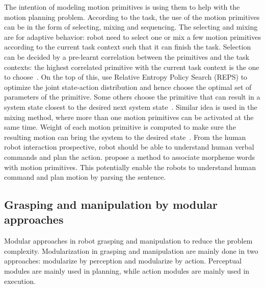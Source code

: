 The intention of modeling motion primitives is using them to help with the motion planning problem. According to the task, the use of the motion primitives can be in the form of selecting, mixing and sequencing. The selecting and mixing are for adaptive behavior: robot need to select one or mix a few motion primitives according to the current task context such that it can finish the task.
Selection can be decided by a pre-learnt correlation between the primitives and the task contexts: the highest correlated primitive with the current task context is the one to choose~\citep{takano2006primitive}. On the top of this, \citet{daniel2013learning} use Relative Entropy Policy Search (REPS) to optimize the joint state-action distribution and hence choose the optimal set of parameters of the primitive.
Some others choose the primitive that can result in a system state closest to the desired next system state~\citep{hauser2008using}. Similar idea is used in the mixing method, where more than one motion primitives can be activated at the same time. Weight of each motion primitive is computed to make sure the resulting motion can bring the system to the desired state~\citep{bidan2013robio,sugimoto2012emosaic}. From the human robot interaction prospective, robot should be able to understand human verbal commands and plan the action. \citet{takano2008integrating} propose a method to associate morpheme words with motion primitives. This potentially enable the robots to understand human command and plan motion by parsing the sentence.




\subsection{Grasping and manipulation by modular approaches}
\label{cha2:sec5:grasping-modular}

Modular approaches in robot grasping and manipulation to reduce the problem complexity. Modularization in grasping and manipulation are mainly done in two approaches: modularize by perception and modularize by action. Perceptual modules are mainly used in planning, while action modules are mainly used in execution.

